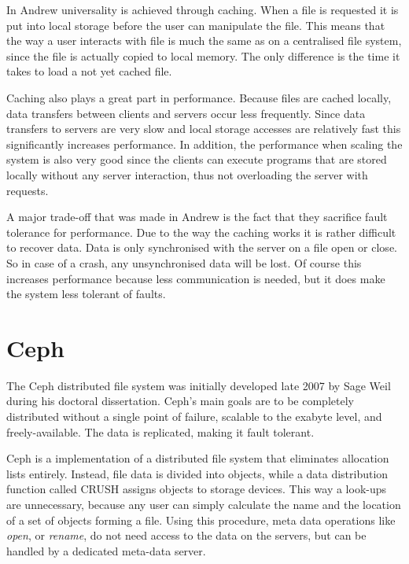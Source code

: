 \documentclass[a4paper,12px]{article}
\begin{document}
In Andrew universality is achieved through caching. When a file is requested it
is put into local storage before the user can manipulate the file. This means
that the way a user interacts with file is much the same as on a centralised
file system, since the file is actually copied to local memory. The only
difference is the time it takes to load a not yet cached file.\cite{concepts}

Caching also plays a great part in performance. Because files are cached
locally, data transfers between clients and servers occur less frequently. Since
data transfers to servers are very slow and local storage accesses are
relatively fast this significantly increases performance. In addition, the
performance when scaling the system is also very good since the clients can
execute programs that are stored locally without any server interaction, thus
not overloading the server with requests.\cite{andrew}

A major trade-off that was made in Andrew is the fact that they sacrifice fault
tolerance for performance. Due to the way the caching works it is rather
difficult to recover data. Data is only synchronised with the server on a file
open or close.\cite{andrew} So in case of a crash, any unsynchronised data will
be lost.  Of course this increases performance because less communication is
needed, but it does make the system less tolerant of faults.

\section{Ceph}

The Ceph distributed file system \cite{weil2006ceph} was initially developed
late 2007 by Sage Weil during his doctoral dissertation. Ceph's main goals are
to be completely distributed without a single point of failure, scalable to the
exabyte level, and freely-available. The data is replicated, making it fault
tolerant.

Ceph is a implementation of a distributed file system that eliminates allocation
lists entirely. Instead, file data is divided into objects, while a data
distribution function called CRUSH assigns objects to storage devices. This way
a look-ups are unnecessary, because any user can simply calculate the name and
the location of a set of objects forming a file.  Using this procedure, meta
data operations like \textit{open}, or \textit{rename}, do not need access to
the data on the servers, but can be handled by a dedicated meta-data
server\cite{weil2006ceph}.
\end{document}
